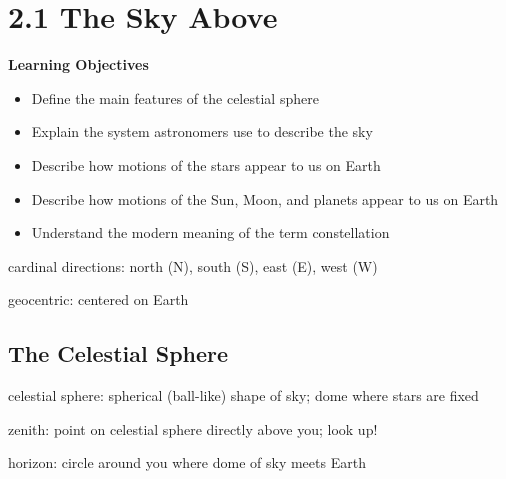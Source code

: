 \documentclass{article}
\begin{document}
\vspace{1em}

\section*{2.1 The Sky Above}

\textbf{Learning Objectives}
\vspace{-1em}

\begin{itemize}
\setlength\itemsep{0.1ex}
    \item Define the main features of the celestial sphere
    \item Explain the system astronomers use to describe the sky
    \item Describe how motions of the stars appear to us on Earth
    \item Describe how motions of the Sun, Moon, and planets appear to us on Earth
    \item Understand the modern meaning of the term constellation
\end{itemize}

\gls{cardinal directions}: north (N), south (S), east (E), west (W)

\gls{geocentric}: centered on Earth

\subsection*{The Celestial Sphere}

\gls{celestial sphere}: spherical (ball-like) shape of sky; dome where stars are fixed


\gls{zenith}: point on celestial sphere directly above you; look up!

\gls{horizon}: circle around you where dome of sky meets Earth
\end{document}
